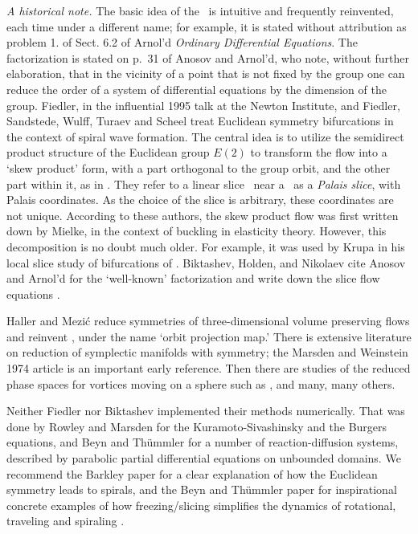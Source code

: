 \documentclass[preprint,number,sort&compress]{elsarticle}
\begin{document}
\emph{A historical note.}
The basic idea of the \mslices\ is intuitive and
frequently reinvented, each time under a different name; for example,
it is stated without attribution as problem 1. of Sect.
6.2 of Arnol'd {\em Ordinary Differential
Equations}. The factorization
 is stated on p.~31 of Anosov and
Arnol'd, who note, without further elaboration,
that in the vicinity of a point that is not fixed by the
group one can reduce the order of a system of differential
equations by the dimension of the group.
Fiedler, in the influential 1995 talk
at the Newton Institute, and Fiedler, Sandstede, Wulff,
Turaev and  Scheel
treat Euclidean symmetry bifurcations in the context of
spiral wave formation. The central idea is to utilize the
semidirect product structure of the Euclidean group $E(2)$ to
transform the flow into a `skew product' form, with a part
orthogonal to the group orbit, and the other part within it,
as in . They refer to a linear slice
\pSRed\ near a \reqv\ as a {\em Palais slice}, with Palais
coordinates. As the choice of the slice is arbitrary, these
coordinates are not unique. According to these authors, the
skew product flow was first written down by
Mielke, in the context of buckling in 
elasticity theory. However, this decomposition is no doubt
much older. For example, it was  used by
Krupa in his local slice study of
bifurcations of \reqva. Biktashev, Holden, and
Nikolaev cite Anosov and Arnol'd  for
the `well-known' factorization  and write
down the slice flow equations .

Haller and Mezi\'c reduce symmetries of
three-dimensional volume preserving flows and reinvent
\mframes, under the name `orbit projection map.' There is
extensive literature on reduction of symplectic manifolds
with symmetry; the Marsden and Weinstein 1974 article
is an important early reference. Then there are studies of
the reduced phase spaces for vortices moving on a sphere such
as , and many, many others.


Neither Fiedler \etal{} nor Biktashev
\etal{} implemented their methods numerically.
That was done by Rowley and Marsden for the
Kuramoto-Sivashinsky and the
Burgers equations, and Beyn and
Th\"ummler for a number of
reaction-diffusion systems, described by parabolic partial
differential equations on unbounded domains. We recommend the
Barkley paper for a clear explanation of how
the Euclidean symmetry leads to spirals, and the Beyn and
Th\"ummler paper for inspirational concrete
examples of how freezing/\-slicing simplifies the
dynamics of rotational, traveling and spiraling \reqva.
\end{document}
